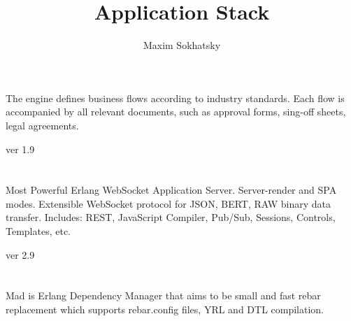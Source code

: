 \documentclass[11pt]{article}
\begin{document}
\title{Application Stack}
\author{Maxim Sokhatsky}


\section*{}
\paragraph{}
The engine defines business flows according to industry standards.
Each flow is accompanied by all relevant documents, such as
approval forms, sing-off sheets, legal agreements.

 ver 1.9


\section*{}

\paragraph{}
Most Powerful Erlang WebSocket Application Server. Server-render and SPA modes.
Extensible WebSocket protocol for JSON, BERT, RAW binary data transfer.
Includes: REST, JavaScript Compiler, Pub/Sub, Sessions, Controls, Templates, etc.

 ver 2.9

\section*{}

\paragraph{}
Mad is Erlang Dependency Manager that aims to be small and fast rebar
replacement which supports rebar.config files, YRL and DTL compilation.
\end{document}
